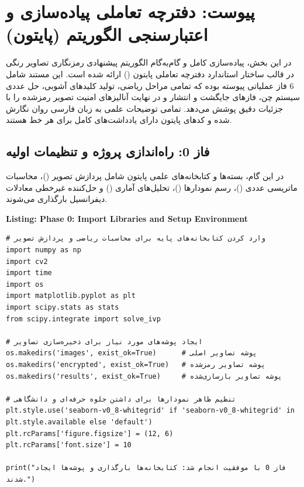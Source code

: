 
\chapter{پیوست: دفترچه تعاملی پیاده‌سازی و اعتبارسنجی الگوریتم (پایتون)}
\label{ch:appendix_code}

در این بخش، پیاده‌سازی کامل و گام‌به‌گام الگوریتم پیشنهادی رمزنگاری تصاویر رنگی در قالب ساختار استاندارد دفترچه تعاملی پایتون () ارائه شده است. این مستند شامل 6 فاز عملیاتی پیوسته بوده که تمامی مراحل ریاضی، تولید کلیدهای آشوبی، حل عددی سیستم چن، فازهای جایگشت و انتشار و در نهایت آنالیزهای امنیت تصویر رمزشده را با جزئیات دقیق پوشش می‌دهد. تمامی توضیحات علمی به زبان فارسی روان نگارش شده و کدهای پایتون دارای یادداشت‌های کامل برای هر خط هستند.

\section{فاز 0: راه‌اندازی پروژه و تنظیمات اولیه}
در این گام، بسته‌ها و کتابخانه‌های علمی پایتون شامل پردازش تصویر ()، محاسبات ماتریسی عددی ()، رسم نمودارها ()، تحلیل‌های آماری () و حل‌کننده غیرخطی معادلات دیفرانسیل بارگذاری می‌شوند.

\begin{latin}
\noindent\textbf{Listing: Phase 0: Import Libraries and Setup Environment}
\begin{verbatim}
# وارد کردن کتابخانه‌های پایه برای محاسبات ریاضی و پردازش تصویر
import numpy as np
import cv2
import time
import os
import matplotlib.pyplot as plt
import scipy.stats as stats
from scipy.integrate import solve_ivp

# ایجاد پوشه‌های مورد نیاز برای ذخیره‌سازی تصاویر
os.makedirs('images', exist_ok=True)      # پوشه تصاویر اصلی
os.makedirs('encrypted', exist_ok=True)   # پوشه تصاویر رمزشده
os.makedirs('results', exist_ok=True)     # پوشه تصاویر بازسازی‌شده

# تنظیم ظاهر نمودارها برای داشتن جلوه حرفه‌ای و دانشگاهی
plt.style.use('seaborn-v0_8-whitegrid' if 'seaborn-v0_8-whitegrid' in plt.style.available else 'default')
plt.rcParams['figure.figsize'] = (12, 6)
plt.rcParams['font.size'] = 10

print("فاز 0 با موفقیت انجام شد: کتابخانه‌ها بارگذاری و پوشه‌ها ایجاد شدند.")
\end{verbatim}
\end{latin}

